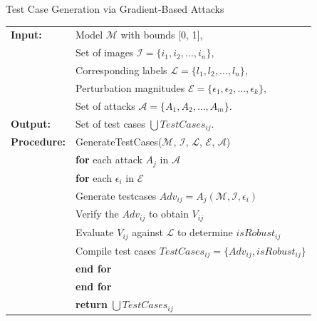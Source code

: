 \begin{algorithm}
    \caption{Test Case Generation via Gradient-Based Attacks}
    \begin{tabular}{l l}
    \textbf{Input:} & Model $\mathcal{M}$ with bounds [0, 1], \\
    & Set of images $\mathcal{I} = \{i_1, i_2, \ldots, i_n\}$, \\
    & Corresponding labels $\mathcal{L} = \{l_1, l_2, \ldots, l_n\}$, \\
    & Perturbation magnitudes $\mathcal{E} = \{\epsilon_1, \epsilon_2, \ldots, \epsilon_k\}$, \\
    & Set of attacks $\mathcal{A} = \{A_1, A_2, \ldots, A_m\}$. \\
    \textbf{Output:} & Set of test cases $\bigcup TestCases_{ij}$. \\
    \textbf{Procedure:} & GenerateTestCases($\mathcal{M}$, $\mathcal{I}$, $\mathcal{L}$, $\mathcal{E}$, $\mathcal{A}$) \\
    & \quad \textbf{for} each attack $A_j$ in $\mathcal{A}$ \\
    & \quad \quad \textbf{for} each $\epsilon_i$ in $\mathcal{E}$ \\
    & \quad \quad \quad Generate testcases  $Adv_{ij} = A_j(\mathcal{M}, \mathcal{I}, \epsilon_i)$ \\
    & \quad \quad \quad Verify the $Adv_{ij}$ to obtain $V_{ij}$ \\
    & \quad \quad \quad Evaluate $V_{ij}$ against $\mathcal{L}$ to determine $isRobust_{ij}$ \\
    & \quad \quad \quad Compile test cases $TestCases_{ij} = \{Adv_{ij}, isRobust_{ij}\}$ \\
    & \quad \quad \textbf{end for} \\
    & \quad \textbf{end for} \\
    & \quad \textbf{return} $\bigcup TestCases_{ij}$ \\
    \end{tabular}
    \end{algorithm}
    
